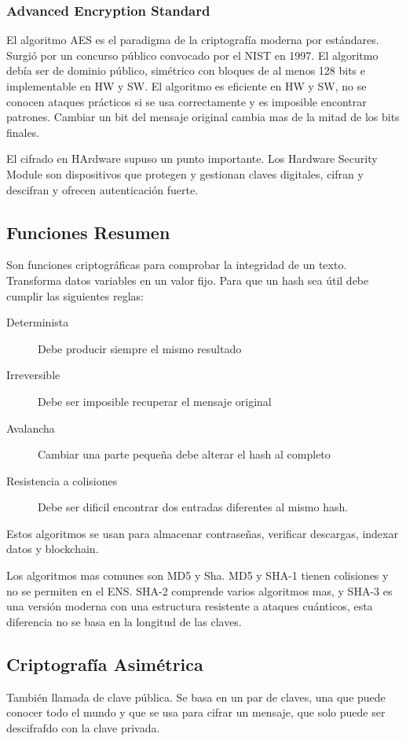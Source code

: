     \subsubsection{Advanced Encryption Standard}
        El algoritmo AES es el paradigma de la criptografía moderna por estándares. Surgió por un concurso público convocado por el NIST en 1997. El algoritmo debía ser de dominio público, simétrico con bloques de al menos 128 bits e implementable en HW y SW. El algoritmo es eficiente en HW y SW, no se conocen ataques prácticos si se usa correctamente y es imposible encontrar patrones. Cambiar un bit del mensaje original cambia mas de la mitad de los bits finales.

        El cifrado en HArdware supuso un punto importante. Los Hardware Security Module son dispositivos que protegen y gestionan claves digitales, cifran y descifran y ofrecen autenticación fuerte.

    \subsection{Funciones Resumen} %
        Son funciones criptográficas para comprobar la integridad de un texto. Transforma datos variables en un valor fijo. Para que un hash sea útil debe cumplir las siguientes reglas:
        \begin{description}
            \item[Determinista] Debe producir siempre el mismo resultado
            \item[Irreversible] Debe ser imposible recuperar el mensaje original
            \item[Avalancha] Cambiar una parte pequeña debe alterar el hash al completo
            \item[Resistencia a colisiones] Debe ser dificil encontrar dos entradas diferentes al mismo hash.
        \end{description}
        Estos algoritmos se usan para almacenar contraseñas, verificar descargas, indexar datos y blockchain.
        
        Los algoritmos mas comunes son MD5 y Sha. MD5 y SHA-1 tienen colisiones y no se permiten en el ENS. SHA-2 comprende varios algoritmos mas, y SHA-3 es una versión moderna con una estructura resistente a ataques cuánticos, esta diferencia no se basa en la longitud de las claves.

\subsection{Criptografía Asimétrica} %
    También llamada de clave pública. Se basa en un par de claves, una que puede conocer todo el mundo y que se usa para cifrar un mensaje, que solo puede ser descifrafdo con la clave privada.

